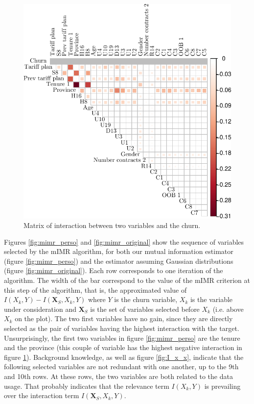 \begin{figure}
    \centering
    \includegraphics[width=0.8\linewidth]{figures/I_x_x_inter.pdf}
    \caption{Matrix of interaction between two variables and the churn.}
    \label{fig:I_x_x_inter}
\end{figure}

Figures \ref{fig:mimr_perso} and \ref{fig:mimr_original} show the sequence of
variables selected by the mIMR algorithm, for both our mutual information
estimator (figure \ref{fig:mimr_perso}) and the estimator assuming Gaussian
distributions (figure \ref{fig:mimr_original}). Each row corresponds to one
iteration of the algorithm. The width of the bar correspond to the value of the
mIMR criterion at this step of the algorithm, that is, the approximated value of
$I(X_k, Y) - I(\bm X_S, X_k, Y)$ where $Y$ is the churn variable, $X_k$ is the
variable under consideration and $\bm X_S$ is the set of variables selected
before $X_k$ (i.e. above $X_k$ on the plot). The two first variables have no
gain, since they are directly selected as the pair of variables having the
highest interaction with the target. Unsurprisingly, the first two variables in
figure \ref{fig:mimr_perso} are the tenure and the province (this couple of
variable has the highest negative interaction in figure \ref{fig:I_x_x_inter}).
Background knowledge, as well as figure \ref{fig:I_x_x}, indicate that the
following selected variables are not redundant with one another, up to the 9th
and 10th rows. At these rows, the two variables are both related to the data
usage. That probably indicates that the relevance term $I(X_k, Y)$ is prevailing
over the interaction term $I(\bm X_S, X_k, Y)$.

